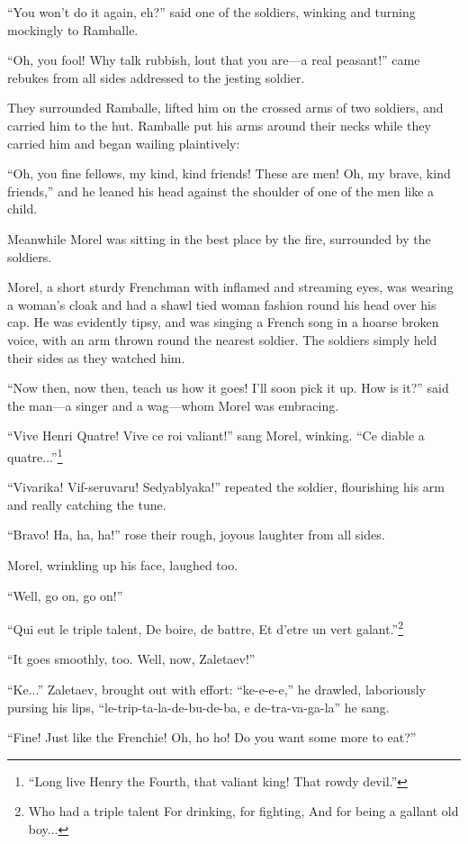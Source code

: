 ``You won't do it again, eh?'' said one of the soldiers, winking
and turning mockingly to Ramballe.

``Oh, you fool! Why talk rubbish, lout that you are---a real
peasant!''  came rebukes from all sides addressed to the jesting
soldier.

They surrounded Ramballe, lifted him on the crossed arms of two
soldiers, and carried him to the hut. Ramballe put his arms
around their necks while they carried him and began wailing
plaintively:

``Oh, you fine fellows, my kind, kind friends! These are men! Oh,
my brave, kind friends,'' and he leaned his head against the
shoulder of one of the men like a child.

Meanwhile Morel was sitting in the best place by the fire,
surrounded by the soldiers.

Morel, a short sturdy Frenchman with inflamed and streaming eyes,
was wearing a woman's cloak and had a shawl tied woman fashion
round his head over his cap. He was evidently tipsy, and was
singing a French song in a hoarse broken voice, with an arm
thrown round the nearest soldier.  The soldiers simply held their
sides as they watched him.

``Now then, now then, teach us how it goes! I'll soon pick it
up. How is it?'' said the man---a singer and a wag---whom Morel
was embracing.

``Vive Henri Quatre! Vive ce roi valiant!'' sang Morel,
winking. ``Ce diable a quatre...''\footnote{``Long live Henry the
Fourth, that valiant king! That rowdy devil.''}

``Vivarika! Vif-seruvaru! Sedyablyaka!'' repeated the soldier,
flourishing his arm and really catching the tune.

``Bravo! Ha, ha, ha!'' rose their rough, joyous laughter from all
sides.

Morel, wrinkling up his face, laughed too.

``Well, go on, go on!''

``Qui eut le triple talent, De boire, de battre, Et d'etre un
vert galant.''\footnote{Who had a triple talent For drinking, for
fighting, And for being a gallant old boy...}

``It goes smoothly, too. Well, now, Zaletaev!''

``Ke...'' Zaletaev, brought out with effort: ``ke-e-e-e,'' he
drawled, laboriously pursing his lips,
``le-trip-ta-la-de-bu-de-ba, e de-tra-va-ga-la'' he sang.

``Fine! Just like the Frenchie! Oh, ho ho! Do you want some more
to eat?''

